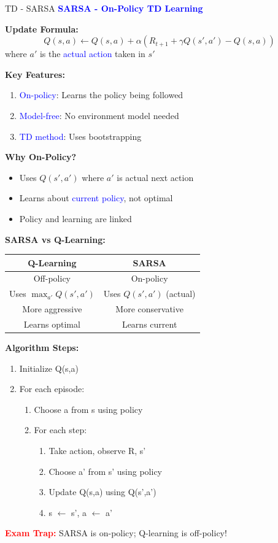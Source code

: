 \documentclass[8pt]{beamer}
\begin{document}
\begin{frame}{TD - SARSA}
\fontsize{6.5}{7.5}\selectfont
\textcolor{blue}{\textbf{SARSA - On-Policy TD Learning}}

\textbf{Update Formula:}
\[
Q(s,a) \leftarrow Q(s,a) + \alpha(R_{t+1} + \gamma Q(s',a') - Q(s,a))
\]
where $a'$ is the \textcolor{blue}{actual action} taken in $s'$

\textbf{Key Features:}
\begin{enumerate}
\item \textcolor{blue}{On-policy}: Learns the policy being followed
\item \textcolor{blue}{Model-free}: No environment model needed
\item \textcolor{blue}{TD method}: Uses bootstrapping
\end{enumerate}

\textbf{Why On-Policy?}
\begin{itemize}
\item Uses $Q(s',a')$ where $a'$ is actual next action
\item Learns about \textcolor{blue}{current policy}, not optimal
\item Policy and learning are linked
\end{itemize}

\textbf{SARSA vs Q-Learning:}
\begin{tabular}{|c|c|}
\hline
Q-Learning & SARSA \\
\hline
Off-policy & On-policy \\
\hline
Uses $\max_{a'} Q(s',a')$ & Uses $Q(s',a')$ (actual) \\
\hline
More aggressive & More conservative \\
\hline
Learns optimal & Learns current \\
\hline
\end{tabular}

\textbf{Algorithm Steps:}
\begin{enumerate}
\item Initialize Q(s,a)
\item For each episode:
\begin{enumerate}
\item Choose a from s using policy
\item For each step:
\begin{enumerate}
\item Take action, observe R, s'
\item Choose a' from s' using policy
\item Update Q(s,a) using Q(s',a')
\item s $\leftarrow$ s', a $\leftarrow$ a'
\end{enumerate}
\end{enumerate}
\end{enumerate}

\textcolor{red}{\textbf{Exam Trap:}} SARSA is on-policy; Q-learning is off-policy!
\end{frame}
\end{document}
